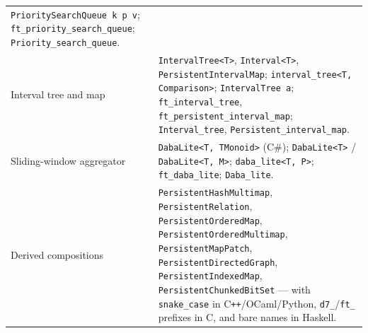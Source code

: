 \documentclass[11pt,twoside,openright]{book}
\makeatletter
\newcommand{\code}[1]{\texorpdfstring{\textcolor{d7ink}{\texttt{#1}}}{#1}}
\newenvironment{d7table}[1]
  {\par\vspace{3pt}\small
   \setlength{\LTpre}{4pt}\setlength{\LTpost}{4pt}
   \begin{longtable}{@{}%
     >{\raggedright\arraybackslash}p{#1\textwidth}%
     @{\hspace{10pt}}%
     >{\raggedright\arraybackslash}p{\dimexpr\textwidth-#1\textwidth-10pt\relax}@{}}}
  {\end{longtable}}
\makeatother
\begin{document}
\begin{d7table}{0.26}
\code{PrioritySearchQueue k p v}; \code{ft\_priority\_search\_queue};
\code{Priority\_search\_queue}. \\
Interval tree and map &
\code{IntervalTree<T>}, \code{Interval<T>},
\code{PersistentIntervalMap}; \code{interval\_tree<T, Comparison>};
\code{IntervalTree a}; \code{ft\_interval\_tree},
\code{ft\_persistent\_interval\_map}; \code{Interval\_tree},
\code{Persistent\_interval\_map}. \\
Sliding-window aggregator &
\code{DabaLite<T, TMonoid>} (C\#); \code{DabaLite<T>} / \code{DabaLite<T, M>};
\code{daba\_lite<T, P>}; \code{ft\_daba\_lite}; \code{Daba\_lite}. \\
Derived compositions &
\code{PersistentHashMultimap}, \code{PersistentRelation},
\code{PersistentOrderedMap}, \code{PersistentOrderedMultimap},
\code{PersistentMapPatch}, \code{PersistentDirectedGraph},
\code{PersistentIndexedMap}, \code{PersistentChunkedBitSet} --- with
\code{snake\_case} in C\texttt{++}/OCaml/Python, \code{d7\_}/\code{ft\_} prefixes
in C, and bare names in Haskell. \\


\end{d7table}
\end{document}
